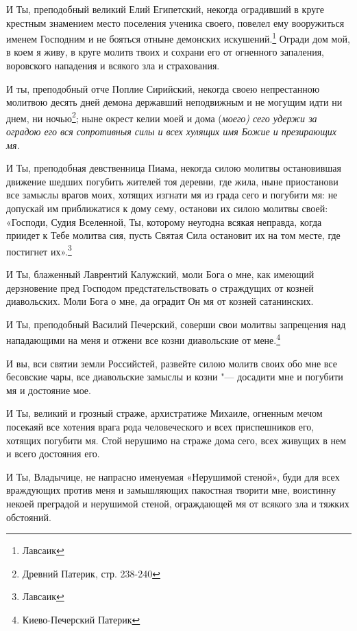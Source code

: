И Ты, преподобный великий Елий Египетский, некогда оградивший в круге крестным знамением место поселения ученика своего, повелел ему вооружиться именем Господним и не бояться отныне демонских искушений.\footnote[5]{Лавсаик} Огради дом мой, в коем я живу, в круге молитв твоих и сохрани его от огненного запаления, воровского нападения и всякого зла и страхования.


И ты, преподобный отче Поплие Сирийский, некогда своею непрестанною молитвою десять дней демона державший неподвижным и не могущим идти ни днем, ни ночью\footnote[6]{Древний Патерик, стр. 238-240}; ныне окрест келии моей и дома (\itshape моего\normalfont{}) сего удержи за оградою его вся сопротивныя силы и всех хулящих имя Божие и презирающих мя.


И Ты, преподобная девственница Пиама, некогда силою молитвы остановившая движение шедших погубить жителей тоя деревни, где жила, ныне приостанови все замыслы врагов моих, хотящих изгнати мя из града сего и погубити мя: не допускай им приближатися к дому сему, останови их силою молитвы своей: «Господи, Судия Вселенной, Ты, которому неугодна всякая неправда, когда приидет к Тебе молитва сия, пусть Святая Сила остановит их на том месте, где постигнет их».\footnote[7]{Лавсаик}


И Ты, блаженный Лаврентий Калужский, моли Бога о мне, как имеющий дерзновение пред Господом предстательствовать о страждущих от козней диавольских. Моли Бога о мне, да оградит Он мя от козней сатанинских.


И Ты, преподобный Василий Печерский, соверши свои молитвы запрещения над нападающими на меня и отжени все козни диавольские от мене.\footnote[8]{Киево-Печерский Патерик}


И вы, вси святии земли Российстей, развейте силою молитв своих обо мне все бесовские чары, все диавольские замыслы и козни "--- досадити мне и погубити мя и достояние мое.


И Ты, великий и грозный страже, архистратиже Михаиле, огненным мечом посекаяй все хотения врага рода человеческого и всех приспешников его, хотящих погубити мя. Стой нерушимо на страже дома сего, всех живущих в нем и всего достояния его.


И Ты, Владычице, не напрасно именуемая «Нерушимой стеной», буди для всех враждующих против меня и замышляющих пакостная творити мне, воистинну некоей преградой и нерушимой стеной, ограждающей мя от всякого зла и тяжких обстояний.
\mychapterending


